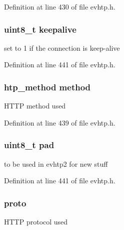 Definition at line 430 of file evhtp.\-h.

\hypertarget{structevhtp__request__s_aba0b971f0932db8772a9091c0da49728}{
\subsubsection[{keepalive}]{\setlength{\rightskip}{0pt plus 5cm}uint8\-\_\-t keepalive}}\label{structevhtp__request__s_aba0b971f0932db8772a9091c0da49728}
set to 1 if the connection is keep-\/alive 

Definition at line 441 of file evhtp.\-h.

\hypertarget{structevhtp__request__s_a5322aefd6f774a31c7cbfaeee0d3a417}{
\subsubsection[{method}]{\setlength{\rightskip}{0pt plus 5cm}htp\-\_\-method method}}\label{structevhtp__request__s_a5322aefd6f774a31c7cbfaeee0d3a417}
H\-T\-T\-P method used 

Definition at line 439 of file evhtp.\-h.

\hypertarget{structevhtp__request__s_ac1a86b4f13c0cf801df27e12ce75f046}{
\subsubsection[{pad}]{\setlength{\rightskip}{0pt plus 5cm}uint8\-\_\-t pad}}\label{structevhtp__request__s_ac1a86b4f13c0cf801df27e12ce75f046}
to be used in evhtp2 for new stuff 

Definition at line 441 of file evhtp.\-h.

\hypertarget{structevhtp__request__s_a3acae974abf6e95063cab796fbe2a7f6}{
\subsubsection[{proto}]{ proto}}\label{structevhtp__request__s_a3acae974abf6e95063cab796fbe2a7f6}
H\-T\-T\-P protocol used 


